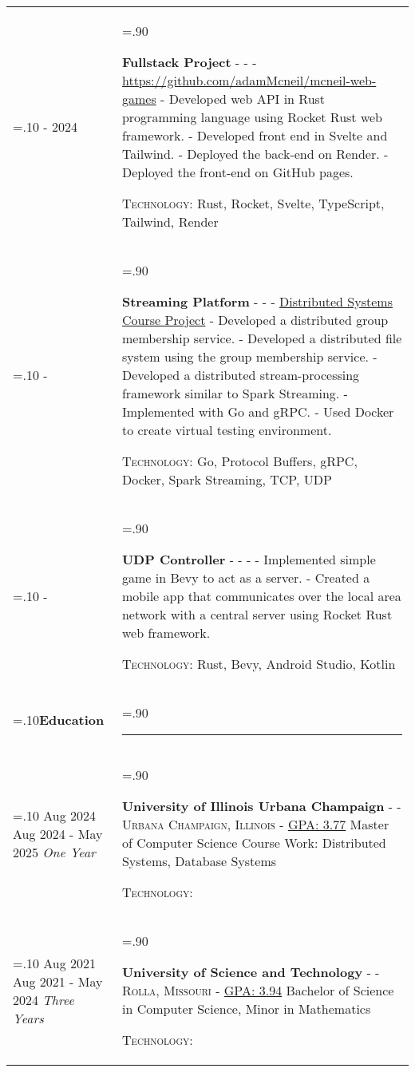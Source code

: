 \documentclass[10pt]{article}
\newcommand{\timeFrame}[3] {
  \if\relax\detokenize{#2}\relax
    #1
  \else
    #1 - #2
  \fi
  \newline
  \scriptsize \textit{#3}
}
\newcommand{\entry}[6] {
  \textbf{#1}
  \if\relax\detokenize{#2}\relax
  \else
       - \textsc{#2}
  \fi
  \if\relax\detokenize{#3}\relax
  \else
      - \textsc{#3}
  \fi
  \if\relax\detokenize{#4}\relax
  \else
      - \href{https://#4}{#4}
  \fi
  \newline #5
  \if\relax\detokenize{#6}\relax
  \else
      \newline \textsc{Technology:} #6
  \fi
  \\
}
\newcommand{\horizontalLine}[0] {
    \noindent\rule{.90\linewidth}{0.4pt}
}
\begin{document}
\begin{tabularx}{\linewidth}{>{\hsize=.10\hsize}X>{\hsize=.90\hsize}X}
\timeFrame{2023}{2024}{} &
\entry{Fullstack Project}
  {}
  {}
  {https://github.com/adamMcneil/mcneil-web-games}
  {
  - Developed web API in Rust programming language using Rocket Rust web framework. \newline
  - Developed front end in Svelte and Tailwind. \newline
  - Deployed the back-end on Render. \newline
  - Deployed the front-end on GitHub pages.
  }
  {Rust, Rocket, Svelte, TypeScript, Tailwind, Render}

\timeFrame{2024}{}{} &
\entry{Streaming Platform}
  {}
  {}
  {Distributed Systems Course Project}
  {
  - Developed a distributed group membership service. \newline
  - Developed a distributed file system using the group membership service. \newline
  - Developed a distributed stream-processing framework similar to Spark Streaming. \newline
  - Implemented with Go and gRPC. \newline
  - Used Docker to create virtual testing environment.
  }
  {Go, Protocol Buffers, gRPC, Docker, Spark Streaming, TCP, UDP}


\timeFrame{2024}{}{} &
\entry{UDP Controller}
  {}
  {}
  {}
  {
    - Implemented simple game in Bevy to act as a server. \newline
    - Created a mobile app that communicates over the local area network with a central server using Rocket Rust web framework.
  }
  {Rust, Bevy, Android Studio, Kotlin}

\textbf{Education} & \horizontalLine \\

\timeFrame{Aug 2024}{May 2025}{One Year} &
\entry{University of Illinois Urbana Champaign}
  {}
  {Urbana Champaign, Illinois}
  {GPA: 3.77}
  {
  Master of Computer Science \newline
      Course Work: Distributed Systems, Database Systems 
  }
  {}

\timeFrame{Aug 2021}{May 2024}{Three Years} &
\entry{University of Science and Technology}
  {}
  {Rolla, Missouri}
  {GPA: 3.94}
  {
  Bachelor of Science in Computer Science, Minor in Mathematics
  }
  {}

\end{tabularx}
\end{document}

